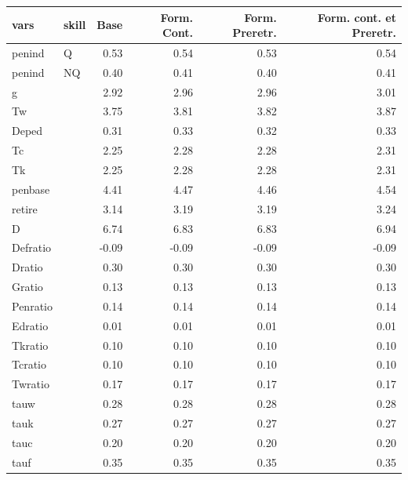 \begin{tabular}{llrrrr}
  \hline
vars & skill & Base & Form. Cont. & Form. Preretr. & Form. cont. et Preretr. \\ 
  \hline
penind & Q & 0.53 & 0.54 & 0.53 & 0.54 \\ 
  penind & NQ & 0.40 & 0.41 & 0.40 & 0.41 \\ 
  g &  & 2.92 & 2.96 & 2.96 & 3.01 \\ 
  Tw &  & 3.75 & 3.81 & 3.82 & 3.87 \\ 
  Deped &  & 0.31 & 0.33 & 0.32 & 0.33 \\ 
  Tc &  & 2.25 & 2.28 & 2.28 & 2.31 \\ 
  Tk &  & 2.25 & 2.28 & 2.28 & 2.31 \\ 
  penbase &  & 4.41 & 4.47 & 4.46 & 4.54 \\ 
  retire &  & 3.14 & 3.19 & 3.19 & 3.24 \\ 
  D &  & 6.74 & 6.83 & 6.83 & 6.94 \\ 
  Defratio &  & -0.09 & -0.09 & -0.09 & -0.09 \\ 
  Dratio &  & 0.30 & 0.30 & 0.30 & 0.30 \\ 
  Gratio &  & 0.13 & 0.13 & 0.13 & 0.13 \\ 
  Penratio &  & 0.14 & 0.14 & 0.14 & 0.14 \\ 
  Edratio &  & 0.01 & 0.01 & 0.01 & 0.01 \\ 
  Tkratio &  & 0.10 & 0.10 & 0.10 & 0.10 \\ 
  Tcratio &  & 0.10 & 0.10 & 0.10 & 0.10 \\ 
  Twratio &  & 0.17 & 0.17 & 0.17 & 0.17 \\ 
  tauw &  & 0.28 & 0.28 & 0.28 & 0.28 \\ 
  tauk &  & 0.27 & 0.27 & 0.27 & 0.27 \\ 
  tauc &  & 0.20 & 0.20 & 0.20 & 0.20 \\ 
  tauf &  & 0.35 & 0.35 & 0.35 & 0.35 \\ 
   \hline
\end{tabular}
